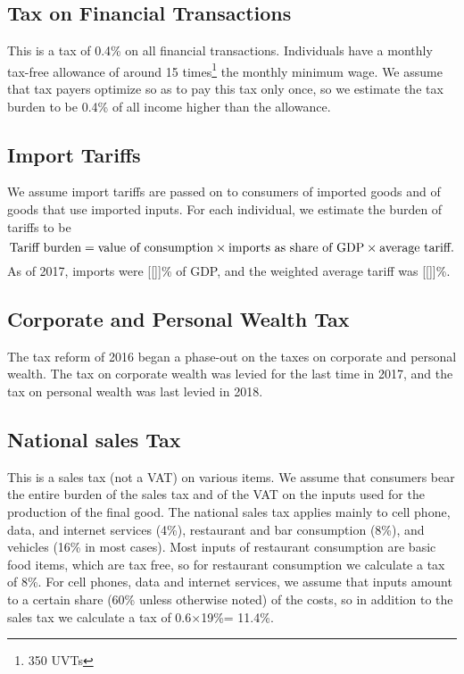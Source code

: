 \documentclass[12pt]{article}
\begin{document}
\begin{appendices}
\subsection{Tax on Financial Transactions}

This is a tax of 0.4\% on all financial transactions.
Individuals have a monthly tax-free allowance of around 15 times\footnote{350 UVTs} the monthly minimum wage.
We assume that tax payers optimize so as to pay this tax only once, so we estimate the tax burden to be 0.4\% of all income higher than the allowance.

\subsection{Import Tariffs}

We assume import tariffs are passed on to consumers of imported goods and of goods that use imported inputs.
For each individual, we estimate the burden of tariffs to be
\begin{equation}
  \textnormal{Tariff burden} = \textnormal{value of consumption} \times \textnormal{imports as share of GDP} \times \textnormal{average tariff}.
\end{equation}
As of 2017, imports were [[]]\% of GDP, and the weighted average tariff was [[]]\%.
\subsection{Corporate and Personal Wealth Tax}
The tax reform of 2016 began a phase-out on the taxes on corporate and personal wealth.
The tax on corporate wealth was levied for the last time in 2017, and the tax on personal wealth was last levied in 2018.
\subsection{National sales Tax}
This is a sales tax (not a VAT) on various items.
We assume that consumers bear the entire burden of the sales tax and of the VAT on the inputs used for the production of the final good.
The national sales tax applies mainly to cell phone, data, and internet services (4\%), restaurant and bar consumption (8\%), and vehicles (16\% in most cases).
Most inputs of restaurant consumption are basic food items, which are tax free, so for restaurant consumption we calculate a tax of 8\%.
For cell phones, data and internet services, we assume that inputs amount to a certain share (60\% unless otherwise noted) of the costs, so in addition to the sales tax we calculate a tax of 0.6$\times$19\%= 11.4\%.


\end{appendices}
\end{document}

